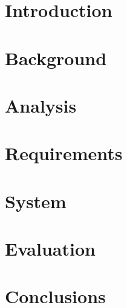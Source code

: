


\noindent



\tableofcontents

\chapter{Introduction}


\chapter{Background}


\chapter{Analysis}


\chapter{Requirements}


\chapter{System}

\chapter{Evaluation}

\chapter{Conclusions}






